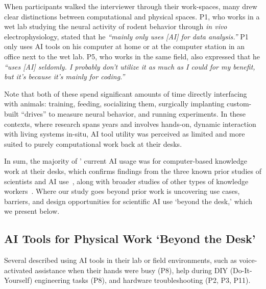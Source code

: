 When participants walked the interviewer through their work-spaces, many drew clear distinctions between computational and physical spaces. P1, who works in a wet lab studying the neural activity of rodent behavior through \textit{in vivo} electrophysiology, stated that he \textit{``mainly only uses [AI] for data analysis.''} P1 only uses AI tools on his computer at home or at the computer station in an office next to the wet lab. P5, who works in the same field, also expressed that he \textit{``uses [AI] seldomly. I probably don't utilize it as much as I could for my benefit, but it's because it's mainly for coding.''}

Note that both of these  spend significant amounts of time directly interfacing with animals: training, feeding, socializing them, surgically implanting custom-built ``drives'' to measure neural behavior, and running experiments. In these contexts, where research spans years and involves hands-on, dynamic interaction with living systems in-situ, AI tool utility was perceived as limited and more suited to purely computational work back at their desks.

In sum, the majority of ' current AI usage was for computer-based knowledge work at their desks, which confirms findings from the three known prior studies of scientists and AI use~\cite{morris2023scientists,wagman2025generative,obrien2025how}, along with broader studies of other types of knowledge workers~\cite{guo2025from, khojah2024beyond, pu2025assistance, liu2023code}. Where our study goes beyond prior work is uncovering use cases, barriers, and design opportunities for scientific AI use `beyond the desk,' which we present below.


\subsection{AI Tools for Physical Work `Beyond the Desk'}


Several described using AI tools in their lab or field environments, such as voice-activated assistance when their hands were busy (P8), help during DIY (Do-It-Yourself) engineering tasks (P8), and hardware troubleshooting (P2, P3, P11).

